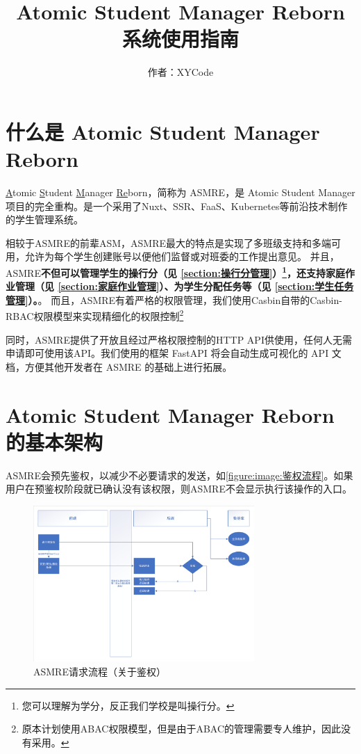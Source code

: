 \documentclass[lang=cn]{elegantpaper}
\title{\textbf{Atomic Student Manager Reborn 系统使用指南}}
\author{作者：XYCode}
\begin{document}
\maketitle

\tableofcontents

\section{什么是 Atomic Student Manager Reborn}
    \uline{A}tomic \uline{S}tudent \uline{M}anager \uline{Re}born，简称为 ASMRE，是 Atomic Student Manager 项目的完全重构。是一个采用了Nuxt、SSR、FaaS、Kubernetes等前沿技术制作的学生管理系统。

    相较于ASMRE的前辈ASM，ASMRE最大的特点是实现了多班级支持和多端可用，允许为每个学生创建账号以便他们监督或对班委的工作提出意见。
    并且，ASMRE\textbf{不但可以管理学生的操行分（见 \autoref{section:操行分管理}）\footnote{您可以理解为学分，反正我们学校是叫操行分。}，还支持家庭作业管理（见 \autoref{section:家庭作业管理}）、为学生分配任务等（见 \autoref{section:学生任务管理}）。}。
    而且，ASMRE有着严格的权限管理，我们使用Casbin自带的Casbin-RBAC权限模型来实现精细化的权限控制\footnote{原本计划使用ABAC权限模型，但是由于ABAC的管理需要专人维护，因此没有采用。}

    同时，ASMRE提供了开放且经过严格权限控制的HTTP API供使用，任何人无需申请即可使用该API。我们使用的框架 FastAPI 将会自动生成可视化的 API 文档，方便其他开发者在 ASMRE 的基础上进行拓展。

\section{Atomic Student Manager Reborn 的基本架构}
    ASMRE会预先鉴权，以减少不必要请求的发送，如\autoref{figure:image:鉴权流程}。如果用户在预鉴权阶段就已确认没有该权限，则ASMRE不会显示执行该操作的入口。

    \begin{figure}[htbp]
        \centering
        \includegraphics[width=0.75\textwidth]{./figure/images/asmre-request-about-permission.pdf}
        \caption{ASMRE请求流程（关于鉴权）}\label{figure:image:鉴权流程}
    \end{figure}
\end{document}
